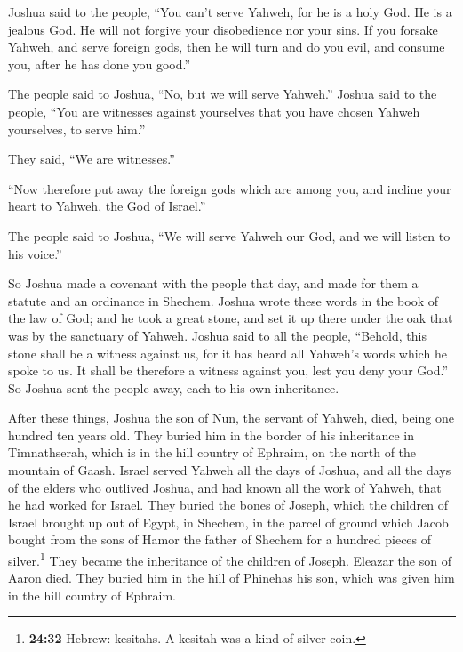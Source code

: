  Joshua said to the people, ``You can't serve Yahweh, for
he is a holy God. He is a jealous God. He will not forgive your
disobedience nor your sins.  If you forsake Yahweh, and
serve foreign gods, then he will turn and do you evil, and consume you,
after he has done you good.''

 The people said to Joshua, ``No, but we will serve
Yahweh.''  Joshua said to the people, ``You are witnesses
against yourselves that you have chosen Yahweh yourselves, to serve
him.''

They said, ``We are witnesses.''

 ``Now therefore put away the foreign gods which are
among you, and incline your heart to Yahweh, the God of Israel.''

 The people said to Joshua, ``We will serve Yahweh our
God, and we will listen to his voice.''

 So Joshua made a covenant with the people that day, and
made for them a statute and an ordinance in Shechem. 
Joshua wrote these words in the book of the law of God; and he took a
great stone, and set it up there under the oak that was by the sanctuary
of Yahweh.  Joshua said to all the people, ``Behold, this
stone shall be a witness against us, for it has heard all Yahweh's words
which he spoke to us. It shall be therefore a witness against you, lest
you deny your God.''  So Joshua sent the people away,
each to his own inheritance.

 After these things, Joshua the son of Nun, the servant
of Yahweh, died, being one hundred ten years old.  They
buried him in the border of his inheritance in Timnathserah, which is in
the hill country of Ephraim, on the north of the mountain of Gaash.
 Israel served Yahweh all the days of Joshua, and all the
days of the elders who outlived Joshua, and had known all the work of
Yahweh, that he had worked for Israel.  They buried the
bones of Joseph, which the children of Israel brought up out of Egypt,
in Shechem, in the parcel of ground which Jacob bought from the sons of
Hamor the father of Shechem for a hundred pieces of silver.\footnote{\textbf{24:32}
  Hebrew: kesitahs. A kesitah was a kind of silver coin.} They became
the inheritance of the children of Joseph.  Eleazar the
son of Aaron died. They buried him in the hill of Phinehas his son,
which was given him in the hill country of Ephraim.
